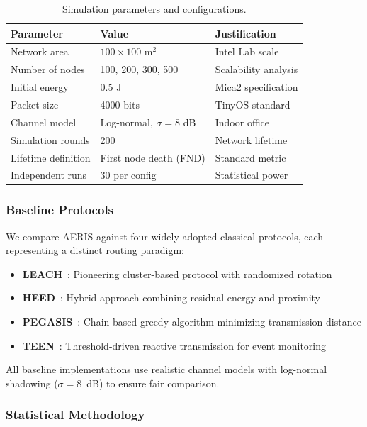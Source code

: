 \documentclass[sensors,article,submit,moreauthors,pdftex]{Definitions/mdpi}
\begin{document}
\begin{table}[H]
\caption{Simulation parameters and configurations.}
\label{tab:parameters}
\centering
\begin{tabular}{lll}
\toprule
\textbf{Parameter} & \textbf{Value} & \textbf{Justification} \\
\midrule
Network area & $100 \times 100$ m$^2$ & Intel Lab scale \\
Number of nodes & 100, 200, 300, 500 & Scalability analysis \\
Initial energy & 0.5 J & Mica2 specification \\
Packet size & 4000 bits & TinyOS standard \\
Channel model & Log-normal, $\sigma=8$ dB & Indoor office \\
Simulation rounds & 200 & Network lifetime \\
Lifetime definition & First node death (FND) & Standard metric \\
Independent runs & 30 per config & Statistical power \\
\bottomrule
\end{tabular}
\end{table}

\subsubsection{Baseline Protocols}

We compare AERIS against four widely-adopted classical protocols, each representing a distinct routing paradigm:
\begin{itemize}
\item \textbf{LEACH}~\cite{Heinzelman2000LEACH}: Pioneering cluster-based protocol with randomized rotation
\item \textbf{HEED}~\cite{Younis2004HEED}: Hybrid approach combining residual energy and proximity
\item \textbf{PEGASIS}~\cite{Lindsey2002PEGASIS}: Chain-based greedy algorithm minimizing transmission distance
\item \textbf{TEEN}~\cite{Manjeshwar2001TEEN}: Threshold-driven reactive transmission for event monitoring
\end{itemize}

All baseline implementations use realistic channel models with log-normal shadowing ($\sigma = 8$~dB) to ensure fair comparison.

\subsubsection{Statistical Methodology}
\end{document}
